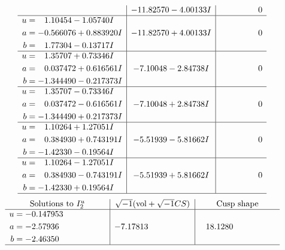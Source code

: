 \documentclass[1p]{elsarticle_modified}
\theoremstyle{definition}
\newcommand{\I}{\sqrt{-1}}
\begin{document}
$$\begin{array}{c|c|c}
 & -11.82570 - 4.00133 I & \phantom{-0.000000 } 0 \\ \hline\begin{aligned}
u &= \phantom{-}1.10454 - 1.05740 I \\
a &= -0.566076 + 0.883920 I \\
b &= \phantom{-}1.77304 - 0.13717 I\end{aligned}
 & -11.82570 + 4.00133 I & \phantom{-0.000000 } 0 \\ \hline\begin{aligned}
u &= \phantom{-}1.35707 + 0.73346 I \\
a &= \phantom{-}0.037472 + 0.616561 I \\
b &= -1.344490 - 0.217373 I\end{aligned}
 & -7.10048 - 2.84738 I & \phantom{-0.000000 } 0 \\ \hline\begin{aligned}
u &= \phantom{-}1.35707 - 0.73346 I \\
a &= \phantom{-}0.037472 - 0.616561 I \\
b &= -1.344490 + 0.217373 I\end{aligned}
 & -7.10048 + 2.84738 I & \phantom{-0.000000 } 0 \\ \hline\begin{aligned}
u &= \phantom{-}1.10264 + 1.27051 I \\
a &= \phantom{-}0.384930 + 0.743191 I \\
b &= -1.42330 - 0.19564 I\end{aligned}
 & -5.51939 - 5.81662 I & \phantom{-0.000000 } 0 \\ \hline\begin{aligned}
u &= \phantom{-}1.10264 - 1.27051 I \\
a &= \phantom{-}0.384930 - 0.743191 I \\
b &= -1.42330 + 0.19564 I\end{aligned}
 & -5.51939 + 5.81662 I & \phantom{-0.000000 } 0\\
 \hline 
 \end{array}$$\newpage$$\begin{array}{c|c|c}  
\text{Solutions to }I^u_{2}& \I (\text{vol} + \sqrt{-1}CS) & \text{Cusp shape}\\
 \hline 
\begin{aligned}
u &= -0.147953\phantom{ +0.000000I} \\
a &= -2.57936\phantom{ +0.000000I} \\
b &= -2.46350\phantom{ +0.000000I}\end{aligned}
 & -7.17813\phantom{ +0.000000I} & \phantom{-}18.1280\phantom{ +0.000000I}\\
 \hline 
 \end{array}$$\newpage
\end{document}
